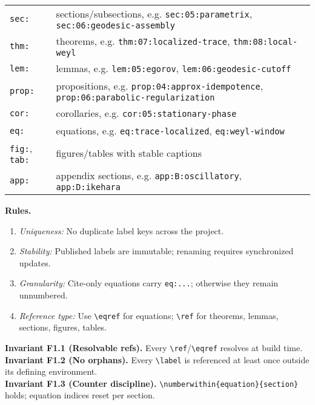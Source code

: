 \begin{center}
\begin{tabular}{ll}
\texttt{sec:} & sections/subsections, e.g. \texttt{sec:05:parametrix}, \texttt{sec:06:geodesic-assembly} \\
\texttt{thm:} & theorems, e.g. \texttt{thm:07:localized-trace}, \texttt{thm:08:local-weyl} \\
\texttt{lem:} & lemmas, e.g. \texttt{lem:05:egorov}, \texttt{lem:06:geodesic-cutoff} \\
\texttt{prop:} & propositions, e.g. \texttt{prop:04:approx-idempotence}, \texttt{prop:06:parabolic-regularization} \\
\texttt{cor:} & corollaries, e.g. \texttt{cor:05:stationary-phase} \\
\texttt{eq:} & equations, e.g. \texttt{eq:trace-localized}, \texttt{eq:weyl-window} \\
\texttt{fig:}, \texttt{tab:} & figures/tables with stable captions \\
\texttt{app:} & appendix sections, e.g. \texttt{app:B:oscillatory}, \texttt{app:D:ikehara} \\
\end{tabular}
\end{center}

\noindent
\textbf{Rules.}
\begin{enumerate}
  \item \emph{Uniqueness:} No duplicate label keys across the project.
  \item \emph{Stability:} Published labels are immutable; renaming requires synchronized updates.
  \item \emph{Granularity:} Cite-only equations carry \texttt{eq:...}; otherwise they remain unnumbered.
  \item \emph{Reference type:} Use \verb|\eqref| for equations; \verb|\ref| for theorems, lemmas, sections, figures, tables.
\end{enumerate}

\noindent\textbf{Invariant F1.1 (Resolvable refs).} Every \verb|\ref|/\verb|\eqref| resolves at build time.\\
\textbf{Invariant F1.2 (No orphans).} Every \verb|\label| is referenced at least once outside its defining environment.\\
\textbf{Invariant F1.3 (Counter discipline).} \verb|\numberwithin{equation}{section}| holds; equation indices reset per section.


